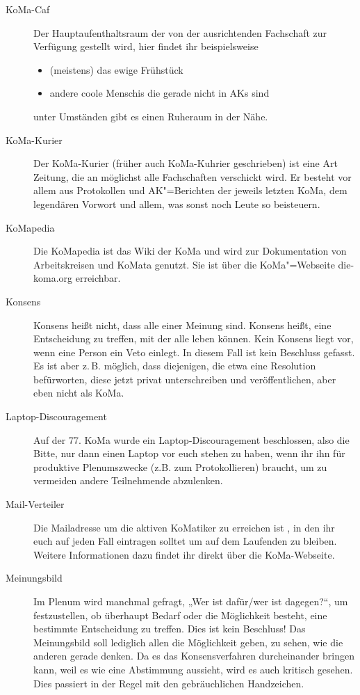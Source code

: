 \begin{description}
\item[KoMa-Caf]
    Der Hauptaufenthaltsraum der von der ausrichtenden Fachschaft zur Verfügung gestellt wird, hier findet ihr beispielsweise
    \begin{itemize}
        \item (meistens) das ewige Frühstück
        \item andere coole Menschis die gerade nicht in AKs sind
    \end{itemize}
    unter Umständen gibt es einen Ruheraum in der Nähe.

\item[KoMa-Kurier]
    Der KoMa-Kurier (früher auch KoMa-Kuhrier geschrieben) ist eine Art Zeitung, die an möglichst alle Fachschaften verschickt wird. Er besteht vor allem aus Protokollen und AK"=Berichten der jeweils letzten KoMa, dem legendären Vorwort und allem, was sonst noch Leute so beisteuern.

\item[KoMapedia]
    Die KoMapedia ist das Wiki der KoMa und wird zur Dokumentation von Arbeitskreisen und KoMata genutzt. Sie ist über die KoMa"=Webseite	die-koma.org erreichbar.

\item[Konsens]
    Konsens heißt nicht, dass alle einer Meinung sind. Konsens heißt, eine Entscheidung zu treffen, mit der alle leben können. Kein Konsens liegt vor, wenn eine Person ein Veto einlegt. In diesem Fall ist kein Beschluss gefasst.  Es ist aber z.\,B. möglich, dass diejenigen, die etwa eine Resolution befürworten, diese jetzt privat unterschreiben und veröffentlichen, aber eben nicht als KoMa.

\item[Laptop-Discouragement]\label{Laptop-Discouragement}
    Auf der 77. KoMa wurde ein Laptop-Discouragement beschlossen, also die Bitte,     nur dann einen Laptop vor euch stehen zu haben, wenn ihr ihn für produktive Plenumszwecke (z.B. zum       Protokollieren) braucht, um zu vermeiden andere Teilnehmende abzulenken.

\item[Mail-Verteiler]
    Die Mailadresse um die aktiven KoMatiker zu erreichen ist , in den ihr euch auf jeden Fall eintragen solltet um auf dem Laufenden zu bleiben. Weitere Informationen dazu findet ihr direkt über die KoMa-Webseite.

\item[Meinungsbild]
    Im Plenum wird manchmal gefragt, „Wer ist dafür/wer ist dagegen?“, um festzustellen, ob überhaupt Bedarf oder die Möglichkeit besteht, eine bestimmte Entscheidung zu treffen. Dies ist kein Beschluss! Das Meinungsbild soll lediglich allen die Möglichkeit geben, zu sehen, wie die anderen gerade denken. Da es das Konsensverfahren durcheinander bringen kann, weil es wie eine Abstimmung aussieht, wird es auch kritisch gesehen. Dies passiert in der Regel mit den gebräuchlichen Handzeichen.


\end{description}
